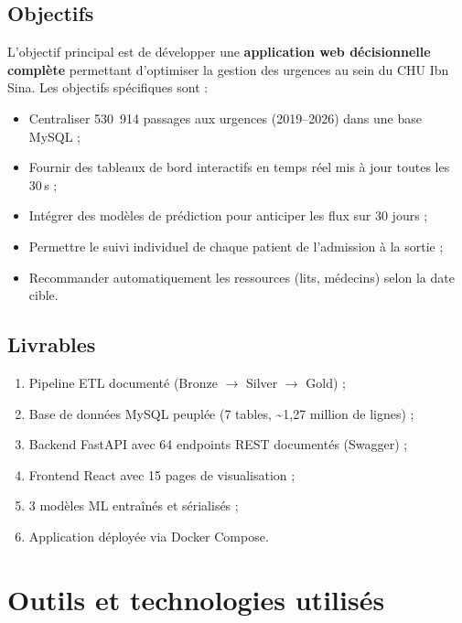 \documentclass[12pt,a4paper]{report}
\begin{document}
	\subsection{Objectifs}
	L'objectif principal est de développer une \textbf{application web décisionnelle complète}
	permettant d'optimiser la gestion des urgences au sein du CHU Ibn Sina. Les objectifs
	spécifiques sont :
	
	\begin{itemize}
		\item Centraliser 530~914 passages aux urgences (2019--2026) dans une base MySQL ;
		\item Fournir des tableaux de bord interactifs en temps réel mis à jour toutes les 30\,s ;
		\item Intégrer des modèles de prédiction pour anticiper les flux sur 30 jours ;
		\item Permettre le suivi individuel de chaque patient de l'admission à la sortie ;
		\item Recommander automatiquement les ressources (lits, médecins) selon la date cible.
	\end{itemize}
	
	\subsection{Livrables}
	\begin{enumerate}
		\item Pipeline ETL documenté (Bronze $\rightarrow$ Silver $\rightarrow$ Gold) ;
		\item Base de données MySQL peuplée (7 tables, \textasciitilde 1,27 million de lignes) ;
		\item Backend FastAPI avec 64 endpoints REST documentés (Swagger) ;
		\item Frontend React avec 15 pages de visualisation ;
		\item 3 modèles ML entraînés et sérialisés ;
		\item Application déployée via Docker Compose.
	\end{enumerate}
	
	\section{Outils et technologies utilisés}
	
\end{document}
